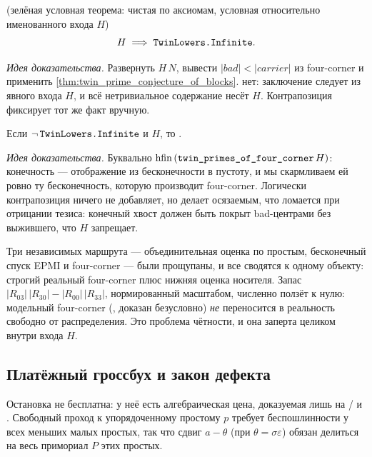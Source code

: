 \begin{theorem}\label{thm:twin_primes_of_four_corner}
\green{} (зелёная условная теорема: чистая по аксиомам, условная относительно именованного входа $H$)
\begin{equation}\label{eq:fourcorner}
  H\;\Longrightarrow\;\texttt{TwinLowers.Infinite}.
\end{equation}
\end{theorem}

\emph{Идея доказательства.} Развернуть $H\,N$, вывести $|\mathit{bad}|<|\mathit{carrier}|$ из
four-corner и применить \cref{thm:twin_prime_conjecture_of_blocks}.  нет: заключение
следует из явного входа $H$, и всё нетривиальное содержание несёт $H$. Контрапозиция фиксирует тот
же факт вручную.

\begin{theorem}\label{thm:twin_finite_contradiction}
Если $\neg\,\texttt{TwinLowers.Infinite}$ и  $H$, то .
\end{theorem}

\emph{Идея доказательства.} Буквально $\mathrm{hfin}\,(\texttt{twin\_primes\_of\_four\_corner}\,H)$:
конечность --- отображение из бесконечности в пустоту, и мы скармливаем ей ровно ту бесконечность,
которую производит four-corner. \green{} Логически контрапозиция ничего не добавляет, но делает
осязаемым, что ломается при отрицании тезиса: конечный хвост должен быть покрыт bad-центрами без
выжившего, что $H$ запрещает.

\begin{remark}
Три независимых маршрута --- объединительная оценка по простым, бесконечный спуск EPMI и four-corner
--- были прощупаны, и все сводятся к одному объекту: строгий реальный four-corner плюс нижняя оценка
носителя. Запас $|R_{03}|\,|R_{30}|-|R_{00}|\,|R_{33}|$, нормированный масштабом, численно ползёт к
нулю: модельный four-corner (, доказан безусловно) \emph{не} переносится в
реальность свободно от распределения. Это проблема чётности, и она заперта целиком внутри \red{}
входа $H$.
\end{remark}

\subsection{Платёжный гроссбух и закон дефекта}

Остановка не бесплатна: у неё есть алгебраическая цена, доказуемая лишь на / и
. Свободный проход к упорядоченному простому $p$ требует беспошлинности у всех меньших
малых простых, так что сдвиг $a-\theta$ (при $\theta=\sigma\varepsilon$) обязан делиться на весь
примориал $P$ этих простых.

